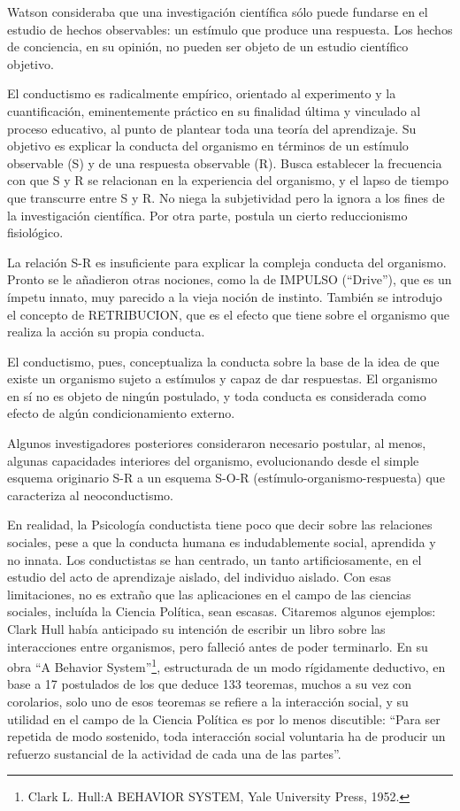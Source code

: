\documentclass[
]{book}
\begin{document}
Watson consideraba que una investigación científica sólo puede fundarse en el estudio de hechos observables: un estímulo que produce una respuesta. Los hechos de conciencia, en su opinión, no pueden ser objeto de un estudio científico objetivo.

El conductismo es radicalmente empírico, orientado al experimento y la cuantificación, eminentemente práctico en su finalidad última y vinculado al proceso educativo, al punto de plantear toda una teoría del aprendizaje. Su objetivo es explicar la conducta del organismo en términos de un estímulo observable (S) y de una respuesta observable (R). Busca establecer la frecuencia con que S y R se relacionan en la experiencia del organismo, y el lapso de tiempo que transcurre entre S y R. No niega la subjetividad pero la ignora a los fines de la investigación científica. Por otra parte, postula un cierto reduccionismo fisiológico.

La relación S-R es insuficiente para explicar la compleja conducta del organismo. Pronto se le añadieron otras nociones, como la de IMPULSO (``Drive''), que es un ímpetu innato, muy parecido a la vieja noción de instinto. También se introdujo el concepto de RETRIBUCION, que es el efecto que tiene sobre el organismo que realiza la acción su propia conducta.

El conductismo, pues, conceptualiza la conducta sobre la base de la idea de que existe un organismo sujeto a estímulos y capaz de dar respuestas. El organismo en sí no es objeto de ningún postulado, y toda conducta es considerada como efecto de algún condicionamiento externo.

Algunos investigadores posteriores consideraron necesario postular, al menos, algunas capacidades interiores del organismo, evolucionando desde el simple esquema originario S-R a un esquema S-O-R (estímulo-organismo-respuesta) que caracteriza al neoconductismo.

En realidad, la Psicología conductista tiene poco que decir sobre las relaciones sociales, pese a que la conducta humana es indudablemente social, aprendida y no innata. Los conductistas se han centrado, un tanto artificiosamente, en el estudio del acto de aprendizaje aislado, del individuo aislado. Con esas limitaciones, no es extraño que las aplicaciones en el campo de las ciencias sociales, incluída la Ciencia Política, sean escasas. Citaremos algunos ejemplos: Clark Hull había anticipado su intención de escribir un libro sobre las interacciones entre organismos, pero falleció antes de poder terminarlo. En su obra ``A Behavior System''\footnote{ Clark L. Hull:A BEHAVIOR SYSTEM, Yale University Press, 1952.}, estructurada de un modo rígidamente deductivo, en base a 17 postulados de los que deduce 133 teoremas, muchos a su vez con corolarios, solo uno de esos teoremas se refiere a la interacción social, y su utilidad en el campo de la Ciencia Política es por lo menos discutible: ``Para ser repetida de modo sostenido, toda interacción social voluntaria ha de producir un refuerzo sustancial de la actividad de cada una de las partes''.
\end{document}
